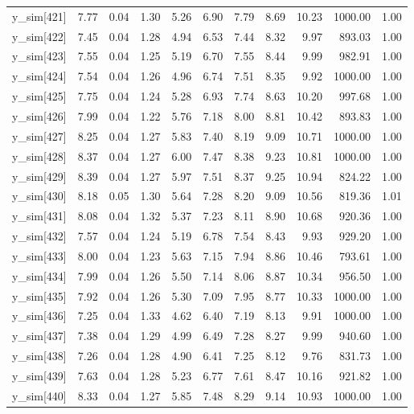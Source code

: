 \begin{table}[ht]
\begin{tabular}{rrrrrrrrrrr}
  y\_sim[421] & 7.77 & 0.04 & 1.30 & 5.26 & 6.90 & 7.79 & 8.69 & 10.23 & 1000.00 & 1.00 \\ 
  y\_sim[422] & 7.45 & 0.04 & 1.28 & 4.94 & 6.53 & 7.44 & 8.32 & 9.97 & 893.03 & 1.00 \\ 
  y\_sim[423] & 7.55 & 0.04 & 1.25 & 5.19 & 6.70 & 7.55 & 8.44 & 9.99 & 982.91 & 1.00 \\ 
  y\_sim[424] & 7.54 & 0.04 & 1.26 & 4.96 & 6.74 & 7.51 & 8.35 & 9.92 & 1000.00 & 1.00 \\ 
  y\_sim[425] & 7.75 & 0.04 & 1.24 & 5.28 & 6.93 & 7.74 & 8.63 & 10.20 & 997.68 & 1.00 \\ 
  y\_sim[426] & 7.99 & 0.04 & 1.22 & 5.76 & 7.18 & 8.00 & 8.81 & 10.42 & 893.83 & 1.00 \\ 
  y\_sim[427] & 8.25 & 0.04 & 1.27 & 5.83 & 7.40 & 8.19 & 9.09 & 10.71 & 1000.00 & 1.00 \\ 
  y\_sim[428] & 8.37 & 0.04 & 1.27 & 6.00 & 7.47 & 8.38 & 9.23 & 10.81 & 1000.00 & 1.00 \\ 
  y\_sim[429] & 8.39 & 0.04 & 1.27 & 5.97 & 7.51 & 8.37 & 9.25 & 10.94 & 824.22 & 1.00 \\ 
  y\_sim[430] & 8.18 & 0.05 & 1.30 & 5.64 & 7.28 & 8.20 & 9.09 & 10.56 & 819.36 & 1.01 \\ 
  y\_sim[431] & 8.08 & 0.04 & 1.32 & 5.37 & 7.23 & 8.11 & 8.90 & 10.68 & 920.36 & 1.00 \\ 
  y\_sim[432] & 7.57 & 0.04 & 1.24 & 5.19 & 6.78 & 7.54 & 8.43 & 9.93 & 929.20 & 1.00 \\ 
  y\_sim[433] & 8.00 & 0.04 & 1.23 & 5.63 & 7.15 & 7.94 & 8.86 & 10.46 & 793.61 & 1.00 \\ 
  y\_sim[434] & 7.99 & 0.04 & 1.26 & 5.50 & 7.14 & 8.06 & 8.87 & 10.34 & 956.50 & 1.00 \\ 
  y\_sim[435] & 7.92 & 0.04 & 1.26 & 5.30 & 7.09 & 7.95 & 8.77 & 10.33 & 1000.00 & 1.00 \\ 
  y\_sim[436] & 7.25 & 0.04 & 1.33 & 4.62 & 6.40 & 7.19 & 8.13 & 9.91 & 1000.00 & 1.00 \\ 
  y\_sim[437] & 7.38 & 0.04 & 1.29 & 4.99 & 6.49 & 7.28 & 8.27 & 9.99 & 940.60 & 1.00 \\ 
  y\_sim[438] & 7.26 & 0.04 & 1.28 & 4.90 & 6.41 & 7.25 & 8.12 & 9.76 & 831.73 & 1.00 \\ 
  y\_sim[439] & 7.63 & 0.04 & 1.28 & 5.23 & 6.77 & 7.61 & 8.47 & 10.16 & 921.82 & 1.00 \\ 
  y\_sim[440] & 8.33 & 0.04 & 1.27 & 5.85 & 7.48 & 8.29 & 9.14 & 10.93 & 1000.00 & 1.00 \\ 

\end{tabular}
\end{table}
